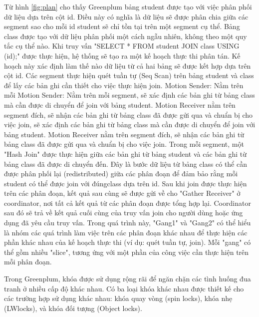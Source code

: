\documentclass{article}[14pt]
\begin{document}
{{Từ hình \ref{fig:plan} cho thấy Greenplum bảng student được tạo với việc phân phối dữ liệu dựa trên cột id. Điều này có nghĩa là dữ liệu sẽ được phân chia giữa các segment sao cho mỗi id student sẽ chỉ tồn tại trên một segment cụ thể. Bảng class được tạo với dữ liệu phân phối một cách ngẫu nhiên, không theo một quy tắc cụ thể nào. Khi truy vấn "SELECT * FROM student JOIN class USING (id);" được thực hiện, hệ thống sẽ tạo ra một kế hoạch thực thi phân tán. Kế hoạch này xác định làm thế nào dữ liệu từ cả hai bảng sẽ được kết hợp dựa trên cột id. Các segment thực hiện quét tuần tự (Seq Scan) trên bảng student và class để lấy các bản ghi cần thiết cho việc thực hiện join. Motion Sender: Nằm trên mỗi Motion Sender: Nằm trên mỗi segment, sẽ xác định các bản ghi từ bảng
class mà cần được di chuyển để join với bảng student.
Motion Receiver nằm trên segment đích, sẽ nhận các bản ghi từ bảng class
đã được gửi qua và chuẩn bị cho việc join, sẽ xác định các bản ghi từ bảng class mà cần được di chuyển để join với bảng student. Motion Receiver nằm trên segment đích, sẽ nhận các bản ghi từ bảng class đã được gửi qua và chuẩn bị cho việc join. Trong mỗi segment, một "Hash Join" được thực hiện giữa các bản ghi từ bảng student và các bản ghi từ bảng class đã được di chuyển đến. Đây là bước dữ liệu từ bảng class có thể cần được phân phối lại (redistributed) giữa các phân đoạn để đảm bảo rằng mỗi student có thể được join với đúngclass dựa trên id. Sau khi join được thực hiện trên các phân đoạn, kết quả sau cùng sẽ được gửi về cho "Gather Receiver" ở coordinator, nơi tất cả kết quả từ các phân đoạn được tổng hợp lại. Coordinator sau đó sẽ trả về kết quả cuối cùng của truy vấn join cho người dùng hoặc ứng dụng đã yêu cầu truy vấn. Trong quá trình này, "Gang1" và "Gang2" có thể hiểu là nhóm các quá trình làm việc trên các phân đoạn khác nhau để thực hiện các phần khác nhau của kế hoạch thực thi (ví dụ: quét tuần tự, join). Mỗi "gang" có thể gồm nhiều "slice", tương ứng với một phần của công việc cần thực hiện trên mỗi phân
đoạn.

Trong Greenplum, khóa được sử dụng rộng rãi để ngăn chặn các tình huống
đua tranh ở nhiều cấp độ khác nhau. Có ba loại khóa khác nhau được thiết kế cho các trường hợp sử dụng khác nhau: khóa quay vòng (spin locks), khóa nhẹ (LWlocks), và khóa đối tượng (Object locks).

}}
\end{document}
